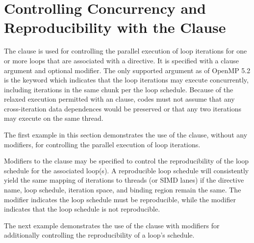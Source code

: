 \pagebreak
\section{Controlling Concurrency and Reproducibility with the  Clause}
\label{sec:order_clause}

The  clause is used for controlling the parallel execution of loop
iterations for one or more loops that are associated with a directive. It is
specified with a clause argument and optional modifier. The only supported
argument as of OpenMP 5.2 is the keyword  which indicates that
the loop iterations may execute concurrently, including iterations in the same
chunk per the loop schedule. Because of the relaxed execution permitted with an
 clause, codes must not assume that any cross-iteration
data dependences would be preserved or that any two iterations may execute on
the same thread.

The first example in this section demonstrates the use of the
 clause, without any modifiers, for controlling the
parallel execution of loop iterations.



Modifiers to the  clause may be specified to control the
reproducibility of the loop schedule for the associated loop(s). A reproducible
loop schedule will consistently yield the same mapping of iterations to threads
(or SIMD lanes) if the directive name, loop schedule, iteration space, and
binding region remain the same. The  modifier indicates the
loop schedule must be reproducible, while the  modifier
indicates that the loop schedule is not reproducible.

The next example demonstrates the use of the  clause
with modifiers for additionally controlling the reproducibility of a loop's
schedule.


